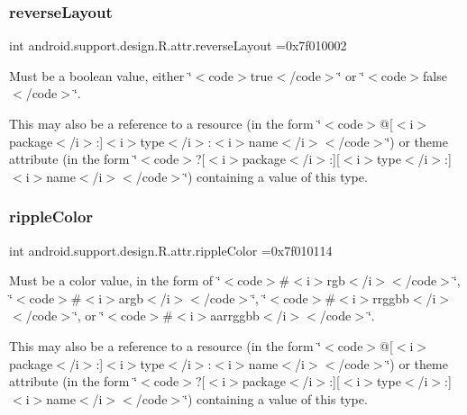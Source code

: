 \subsubsection{\texorpdfstring{reverse\+Layout}{reverseLayout}}
{\footnotesize\ttfamily int android.\+support.\+design.\+R.\+attr.\+reverse\+Layout =0x7f010002\hspace{0.3cm}{\ttfamily [static]}}

Must be a boolean value, either \char`\"{}$<$code$>$true$<$/code$>$\char`\"{} or \char`\"{}$<$code$>$false$<$/code$>$\char`\"{}. 

This may also be a reference to a resource (in the form \char`\"{}$<$code$>$@\mbox{[}$<$i$>$package$<$/i$>$\+:\mbox{]}$<$i$>$type$<$/i$>$\+:$<$i$>$name$<$/i$>$$<$/code$>$\char`\"{}) or theme attribute (in the form \char`\"{}$<$code$>$?\mbox{[}$<$i$>$package$<$/i$>$\+:\mbox{]}\mbox{[}$<$i$>$type$<$/i$>$\+:\mbox{]}$<$i$>$name$<$/i$>$$<$/code$>$\char`\"{}) containing a value of this type. \mbox{\label{classandroid_1_1support_1_1design_1_1R_1_1attr_a03164f9c470ccf03a4ce67c539f71698}} 
\subsubsection{\texorpdfstring{ripple\+Color}{rippleColor}}
{\footnotesize\ttfamily int android.\+support.\+design.\+R.\+attr.\+ripple\+Color =0x7f010114\hspace{0.3cm}{\ttfamily [static]}}

Must be a color value, in the form of \char`\"{}$<$code$>$\#$<$i$>$rgb$<$/i$>$$<$/code$>$\char`\"{}, \char`\"{}$<$code$>$\#$<$i$>$argb$<$/i$>$$<$/code$>$\char`\"{}, \char`\"{}$<$code$>$\#$<$i$>$rrggbb$<$/i$>$$<$/code$>$\char`\"{}, or \char`\"{}$<$code$>$\#$<$i$>$aarrggbb$<$/i$>$$<$/code$>$\char`\"{}. 

This may also be a reference to a resource (in the form \char`\"{}$<$code$>$@\mbox{[}$<$i$>$package$<$/i$>$\+:\mbox{]}$<$i$>$type$<$/i$>$\+:$<$i$>$name$<$/i$>$$<$/code$>$\char`\"{}) or theme attribute (in the form \char`\"{}$<$code$>$?\mbox{[}$<$i$>$package$<$/i$>$\+:\mbox{]}\mbox{[}$<$i$>$type$<$/i$>$\+:\mbox{]}$<$i$>$name$<$/i$>$$<$/code$>$\char`\"{}) containing a value of this type. \mbox{\label{classandroid_1_1support_1_1design_1_1R_1_1attr_a5db56ee02e5f7a0494a2e099b6d10644}} 
